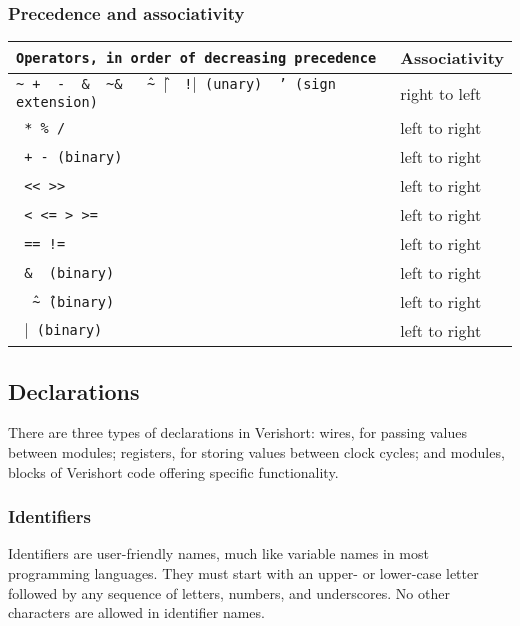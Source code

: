 \documentclass[letterpaper,11pt]{article}
\begin{document}
        
        \subsubsection{Precedence and associativity}
        
        \begin{center} 
        \begin{tabular}{|>{\texttt\bgroup}l<{\egroup}|l|}
        \hline
        Operators, in order of decreasing precedence &Associativity\\ \hline
        \textasciitilde \ + \ - \ \& \ \textasciitilde \&	 \ \^ \ \textasciitilde \^ 	\ $\mid$ \ !$\mid$ (unary) \ ' (sign extension) &	 right to left \\ \hline
        * \% /	& 	left to right \\ \hline
        	+ - (binary)		& 	left to right \\ \hline
        << >> & 	left to right \\ \hline
        < <= > >=					& 	left to right \\ \hline
        == !=				&	left to right \\ \hline
        \& \ (binary)				&	left to right \\ \hline
        \^ \ \textasciitilde\^ \ (binary)		&	left to right \\ \hline
        $\mid$ (binary)				&	left to right \\ \hline
        
        \end{tabular}
        \end{center}
        
    \subsection{Declarations}
    There are three types of declarations in Verishort: wires, for passing values between
    modules; registers, for storing values between clock cycles; and modules, blocks of
    Verishort code offering specific functionality.\\
    
        \subsubsection{Identifiers}
        Identifiers are user-friendly names, much like variable names in most programming
        languages.  They must start with an upper- or lower-case letter followed by any 
        sequence of letters, numbers, and underscores.  No other characters are allowed in
        identifier names.\\
        
\end{document}
